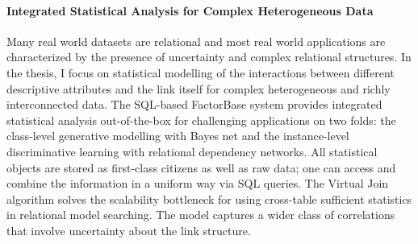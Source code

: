 \documentclass{sfuthesis}
\begin{document}
\paragraph{Integrated Statistical Analysis for Complex Heterogeneous Data}
Many real world datasets are relational and most real world applications are characterized by the presence of uncertainty and complex relational structures. In the thesis, I focus on statistical modelling of the interactions between different descriptive attributes and the link itself for complex heterogeneous and richly interconnected data.
The SQL-based FactorBase system provides integrated statistical analysis out-of-the-box for challenging applications on two folds: the class-level generative modelling with Bayes net and the instance-level discriminative learning with relational dependency networks.  All statistical objects are stored as first-class citizens as well as  raw data; one can access and combine the information in a uniform way via SQL queries. The Virtual Join algorithm solves the scalability bottleneck for using cross-table sufficient statistics in relational model searching. The model captures a wider class of correlations that involve uncertainty about the link structure.
 


\backmatter%
	
	 

\let\svaddcontentsline\addcontentsline
\renewcommand\addcontentsline[3]{%
  \ifthenelse{\equal{#1}{lof}}{}%
  {\ifthenelse{\equal{#1}{lot}}{}{\svaddcontentsline{#1}{#2}{#3}}}}
\end{document}
